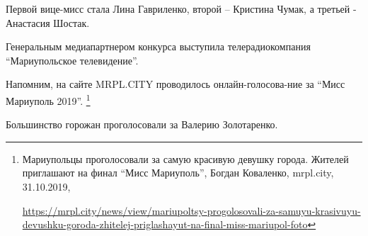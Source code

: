 Первой вице-мисс стала Лина Гавриленко, второй – Кристина Чумак, а третьей -
Анастасия Шостак.

Генеральным медиапартнером конкурса выступила телерадиокомпания
\enquote{Мариупольское телевидение}.

Напомним, на сайте MRPL.CITY проводилось онлайн-голосова\hyp{}ние за \enquote{Мисс
Мариуполь 2019}.%
\footnote{Мариупольцы проголосовали за самую красивую девушку города. Жителей приглашают на финал \enquote{Мисс Мариуполь}, %
Богдан Коваленко, mrpl.city, 31.10.2019, \par%
\url{https://mrpl.city/news/view/mariupoltsy-progolosovali-za-samuyu-krasivuyu-devushku-goroda-zhitelej-priglashayut-na-final-miss-mariupol-foto}
}

Большинство горожан проголосовали за Валерию Золотаренко.
